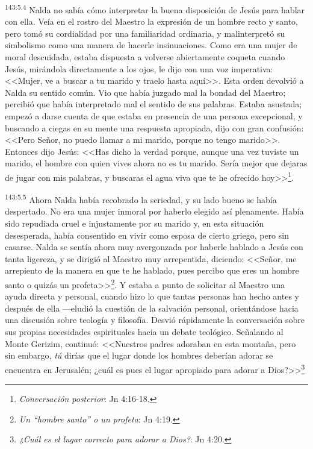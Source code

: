 \par 
\textsuperscript{143:5.4} Nalda no sabía cómo interpretar la buena disposición de Jesús para hablar con ella. Veía en el rostro del Maestro la expresión de un hombre recto y santo, pero tomó su cordialidad por una familiaridad ordinaria, y malinterpretó su simbolismo como una manera de hacerle insinuaciones. Como era una mujer de moral descuidada, estaba dispuesta a volverse abiertamente coqueta cuando Jesús, mirándola directamente a los ojos, le dijo con una voz imperativa: <<Mujer, ve a buscar a tu marido y traelo hasta aquí>>. Esta orden devolvió a Nalda su sentido común. Vio que había juzgado mal la bondad del Maestro; percibió que había interpretado mal el sentido de sus palabras. Estaba asustada; empezó a darse cuenta de que estaba en presencia de una persona excepcional, y buscando a ciegas en su mente una respuesta apropiada, dijo con gran confusión: <<Pero Señor, no puedo llamar a mi marido, porque no tengo marido>>. Entonces dijo Jesús: <<Has dicho la verdad porque, aunque una vez tuviste un marido, el hombre con quien vives ahora no es tu marido. Sería mejor que dejaras de jugar con mis palabras, y buscaras el agua viva que te he ofrecido hoy>>\footnote{\textit{Conversación posterior}: Jn 4:16-18.}.

\par 
\textsuperscript{143:5.5} Ahora Nalda había recobrado la seriedad, y su lado bueno se había despertado. No era una mujer inmoral por haberlo elegido así plenamente. Había sido repudiada cruel e injustamente por su marido y, en esta situación desesperada, había consentido en vivir como esposa de cierto griego, pero sin casarse. Nalda se sentía ahora muy avergonzada por haberle hablado a Jesús con tanta ligereza, y se dirigió al Maestro muy arrepentida, diciendo: <<Señor, me arrepiento de la manera en que te he hablado, pues percibo que eres un hombre santo o quizás un profeta>>\footnote{\textit{Un ``hombre santo'' o un profeta}: Jn 4:19.}. Y estaba a punto de solicitar al Maestro una ayuda directa y personal, cuando hizo lo que tantas personas han hecho antes y después de ella ---eludió la cuestión de la salvación personal, orientándose hacia una discusión sobre teología y filosofía. Desvió rápidamente la conversación sobre sus propias necesidades espirituales hacia un debate teológico. Señalando al Monte Gerizim, continuó: <<Nuestros padres adoraban en esta montaña, pero sin embargo, \textit{tú} dirías que el lugar donde los hombres deberían adorar se encuentra en Jerusalén; ¿cuál es pues el lugar apropiado para adorar a Dios?>>\footnote{\textit{¿Cuál es el lugar correcto para adorar a Dios?}: Jn 4:20.}

